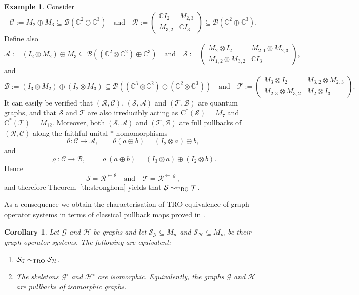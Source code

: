 \documentclass[11pt]{amsart}
\numberwithin{equation}{section}
\theoremstyle{plain}
\newtheorem{corollary}[theorem]{Corollary}
\theoremstyle{definition}
\newtheorem{example}[theorem]{Example}
\theoremstyle{remark}
\newcommand{\A}{{\mathcal{A}}}
\newcommand{\B}{{\mathcal{B}}}
\newcommand{\C}{{\mathcal{C}}}
\newcommand{\G}{{\mathcal{G}}}
\renewcommand{\H}{{\mathcal{H}}}
\newcommand{\R}{{\mathcal{R}}}
\renewcommand{\S}{{\mathcal{S}}}
\newcommand{\T}{{\mathcal{T}}}
\newcommand{\bC}{\mathbb{C}}
\newcommand{\qand}{\quad\text{and}\quad}
\newcommand{\ca}{\mathrm{C}^*}
\begin{document}
\begin{example}
Consider
\[
\C := M_2 \oplus M_3 \subseteq \B(\bC^2 \oplus \bC^3)
\qand
\R :=
\begin{pmatrix}
\bC I_2 & M_{2,3}\\[2mm]
M_{3,2} & \bC I_3
\end{pmatrix}
\subseteq \B(\bC^2 \oplus \bC^3).
\]
Define also
\[
\A := (I_2\otimes M_2)\oplus M_3
\subseteq \B((\bC^2\otimes \bC^2)\oplus \bC^3)
\qand
\S:=
\begin{pmatrix}
M_2\otimes I_2 & M_{2,1}\otimes M_{2,3}\\[2mm]
M_{1,2}\otimes M_{3,2} & \bC I_3
\end{pmatrix},
\]
and
\[
\B := (I_3\otimes M_2)\oplus (I_2\otimes M_3)
\subseteq \B((\bC^3\otimes \bC^2)\oplus (\bC^2\otimes \bC^3))
\qand
\T:=
\begin{pmatrix}
M_3\otimes I_2 & M_{3,2}\otimes M_{2,3}\\[2mm]
M_{2,3}\otimes M_{3,2} & M_2\otimes I_3
\end{pmatrix}.
\]
It can easily be verified that $(\R,\C)$, $(\S,\A)$ and $(\T,\B)$ are quantum graphs, and that $\S$ and $\T$ are also irreducibly acting as  $ \ca(\S)= M_7$ and $\ca(\T)=M_{12}$. Moreover, both $(\S,\A)$ and $(\T,\B)$ are full pullbacks of $(\R,\C)$ along the faithful unital $*$-homomorphisms
\[
\theta \colon \C\to \A,
\qquad
\theta(a\oplus b)=(I_2\otimes a)\oplus b,
\]
and
\[
\varrho \colon \C\to \B,
\qquad
\varrho(a\oplus b)=(I_3\otimes a)\oplus (I_2\otimes b).
\]
Hence
\[
\S=\R^{\leftarrow\theta}
\qand
\T=\R^{\leftarrow\varrho},
\]
and therefore Theorem~\ref{th:stronghom} yields that
$\S\sim_{\rm TRO}\T$.
\end{example}

As a consequence we obtain the characterisation of TRO-equivalence of graph operator systems in terms of classical pullback maps proved in \cite[Corollary 7.6]{EKT21}.

\begin{corollary}\cite[Corollary 7.6]{EKT21}\label{cor:classical}
Let $\G$ and $\H$ be graphs and let 
$\S_{\G} \subseteq M_n$ and 
$\S_{\H} \subseteq M_m$ 
be their graph operator systems.  
The following are equivalent:
\begin{enumerate}
\item $\S_{\G} \sim_{\rm TRO} \S_{\H}$.
\item The skeletons $\G^\circ$ and $\H^\circ$ are isomorphic. Equivalently, the graphs $\G$ and $\H$ are pullbacks of isomorphic graphs. 
\end{enumerate}
\end{corollary}
\end{document}
